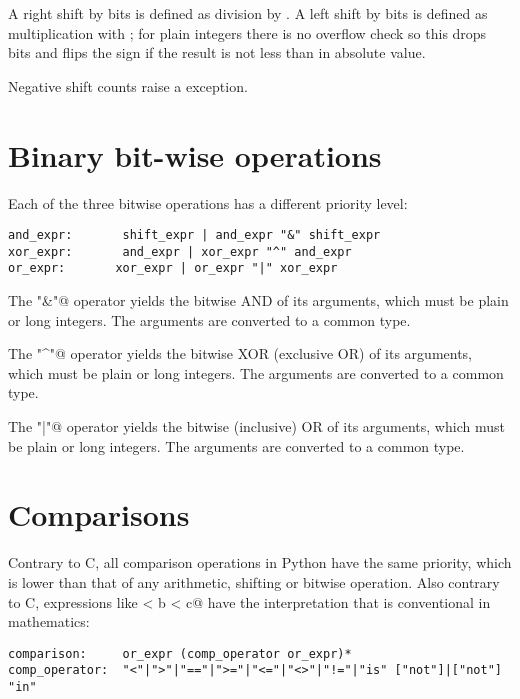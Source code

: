 A right shift by  bits is defined as division by
.  A left shift by  bits is defined as
multiplication with ; for plain integers there is
no overflow check so this drops bits and flips the sign if the result
is not less than  in absolute value.

Negative shift counts raise a \verb@ValueError@ exception.

\section{Binary bit-wise operations}

Each of the three bitwise operations has a different priority level:

\begin{verbatim}
and_expr:       shift_expr | and_expr "&" shift_expr
xor_expr:       and_expr | xor_expr "^" and_expr
or_expr:       xor_expr | or_expr "|" xor_expr
\end{verbatim}

The \verb@"&"@ operator yields the bitwise AND of its arguments, which
must be plain or long integers.  The arguments are converted to a
common type.

The \verb@"^"@ operator yields the bitwise XOR (exclusive OR) of its
arguments, which must be plain or long integers.  The arguments are
converted to a common type.

The \verb@"|"@ operator yields the bitwise (inclusive) OR of its
arguments, which must be plain or long integers.  The arguments are
converted to a common type.

\section{Comparisons}

Contrary to C, all comparison operations in Python have the same
priority, which is lower than that of any arithmetic, shifting or
bitwise operation.  Also contrary to C, expressions like
\verb@a < b < c@ have the interpretation that is conventional in
mathematics:

\begin{verbatim}
comparison:     or_expr (comp_operator or_expr)*
comp_operator:  "<"|">"|"=="|">="|"<="|"<>"|"!="|"is" ["not"]|["not"] "in"
\end{verbatim}


